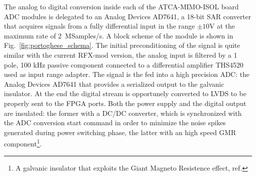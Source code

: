 The analog to digital conversion inside each of the ATCA-MIMO-ISOL board ADC modules is delegated to an Analog Devices AD7641, a 18-bit SAR converter that acquires signals from a fully differential input in the range $\pm 10$V at the maximum rate of 2~MSamples/s. A block scheme of the module is shown in Fig.~\ref{fig:portoghese_schema}. The initial preconditioning of the signal is quite similar with the current RFX-mod version, the analog input is filtered by a 1 pole, 100 kHz passive component connected to a differential amplifier THS4520 used as input range adapter.
The signal is the fed into a high precision ADC: the Analog Devices AD7641 that provides a serialized output to the galvanic insulator.
At the end the digital stream is opportunely converted to LVDS to be properly sent to the FPGA ports. Both the power supply and the digital output are insulated: the former with a DC/DC converter, which is synchronized with the ADC conversion start command in order to minimize the noise spikes generated during power switching phase, the latter with an high speed GMR component\footnote{A galvanic insulator that exploits the Giant Magneto Resistence effect, ref.\cite{Hirota2002}}.

